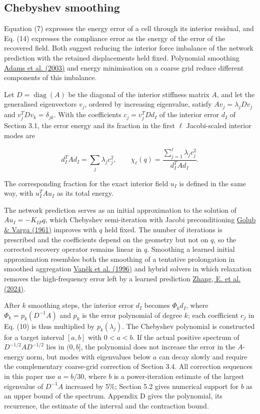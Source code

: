 \documentclass[preprint,12pt,authoryear]{elsarticle}
\begin{document}
\subsection{Chebyshev smoothing}

Equation (7) expresses the energy error of a cell through its interior residual, and Eq. (14) expresses the compliance error as the energy of the error of the recovered field. Both suggest reducing the interior force imbalance of the network prediction with the retained displacements held fixed. Polynomial smoothing \href{https://doi.org/10.1016/s0021-9991(03)00194-3}{Adams et al. (2003)} and energy minimisation on a coarse grid reduce different components of this imbalance.

Let \(D=\operatorname{diag}(A)\) be the diagonal of the interior stiffness matrix \(A\), and let the generalised eigenvectors \(v_j\), ordered by increasing eigenvalue, satisfy \(Av_j=\lambda_jDv_j\) and \(v_j^TDv_k=\delta_{jk}\). With the coefficients \(c_j=v_j^TDd_I\) of the interior error \(d_I\) of Section 3.1, the error energy and its fraction in the first \(\ell\) Jacobi-scaled interior modes are

\[
d_I^TAd_I=\sum_j\lambda_jc_j^2,\qquad
\chi_\ell(q)=\frac{\sum_{j=1}^{\ell}\lambda_jc_j^2}{d_I^TAd_I}.
\tag{10}
\]

The corresponding fraction for the exact interior field \(u_I\) is defined in the same way, with \(u_I^TAu_I\) as its total energy.

The network prediction serves as an initial approximation to the solution of \(Au_I=-K_{IP}q\), which Chebyshev semi-iteration with Jacobi preconditioning \href{https://doi.org/10.1007/BF01386013}{Golub \& Varga (1961)} improves with \(q\) held fixed. The number of iterations is prescribed and the coefficients depend on the geometry but not on \(q\), so the corrected recovery operator remains linear in \(q\). Smoothing a learned initial approximation resembles both the smoothing of a tentative prolongation in smoothed aggregation \href{https://doi.org/10.1007/BF02238511}{Vaněk et al. (1996)} and hybrid solvers in which relaxation removes the high-frequency error left by a learned prediction \href{https://doi.org/10.1038/s42256-024-00910-x}{Zhang, E. et al. (2024)}.

After \(k\) smoothing steps, the interior error \(d_I\) becomes \(\Phi_kd_I\), where \(\Phi_k=p_k(D^{-1}A)\) and \(p_k\) is the error polynomial of degree \(k\); each coefficient \(c_j\) in Eq. (10) is thus multiplied by \(p_k(\lambda_j)\). The Chebyshev polynomial is constructed for a target interval \([a,b]\) with \(0<a<b\). If the actual positive spectrum of \(D^{-1/2}AD^{-1/2}\) lies in \((0,b]\), the polynomial does not increase the error in the \(A\)-energy norm, but modes with eigenvalues below \(a\) can decay slowly and require the complementary coarse-grid correction of Section 3.4. All correction sequences in this paper use \(a=b/30\), where \(b\) is a power-iteration estimate of the largest eigenvalue of \(D^{-1}A\) increased by 5\%; Section 5.2 gives numerical support for \(b\) as an upper bound of the spectrum. Appendix D gives the polynomial, its recurrence, the estimate of the interval and the contraction bound.
\end{document}
